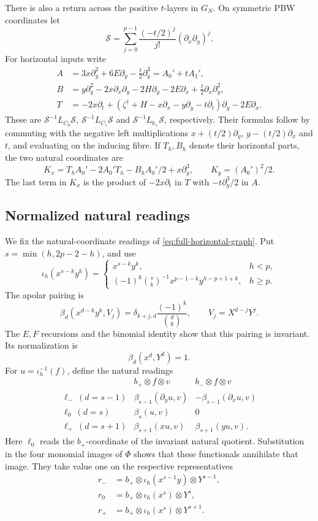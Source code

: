 \documentclass[11pt]{article}
\theoremstyle{plain}
\theoremstyle{definition}
\theoremstyle{remark}
\numberwithin{equation}{section}
\begin{document}
There is also a return across the positive $t$-layers in $G_N$.
On symmetric PBW coordinates let
\[
 \mathscr S=\sum_{j=0}^{p-1}\frac{(-t/2)^j}{j!}
                       (\partial_x\partial_y)^j.
\]
For horizontal inputs write
\begin{align*}
 A&=3x\partial_y^2+6E\partial_y-\tfrac t2\partial_y^3=A_0'+tA_1',\\
 B&=y\partial_y^2-2x\partial_x\partial_y-2H\partial_y-2E\partial_x
                       +\tfrac t2\partial_x\partial_y^2,\\
 T&=-2x\partial_t+
 (\zeta^\dagger+H-x\partial_x-y\partial_y-t\partial_t)\partial_y-2E\partial_x.
\end{align*}
These are $\mathscr S^{-1}L_{C_0}\mathscr S$,
$\mathscr S^{-1}L_{C_1}\mathscr S$ and
$\mathscr S^{-1}L_{b_+}\mathscr S$, respectively.
Their formulas follow by commuting with the negative left multiplications
$x+(t/2)\partial_y$, $y-(t/2)\partial_x$ and $t$, and evaluating on the inducing fibre.
If $T_h,B_h$ denote their horizontal parts, the two natural coordinates are
\[
 K_x=T_hA_0'-2A_0'T_h-B_hA_0'/2+x\partial_y^3,
 \qquad K_y=(A_0')^2/2.
\]
The last term in $K_x$ is the product of $-2x\partial_t$ in $T$
with $-t\partial_y^3/2$ in $A$.

\subsection{Normalized natural readings}\label{sec:normalized-natural}

We fix the natural-coordinate readings of
\eqref{eq:full-horizontal-graph}.
Put \(s=\min(h,2p-2-h)\), and use
\[
 \iota_h(x^{s-k}y^k)=
 \begin{cases}
 x^{s-k}y^k,&h<p,\\
 (-1)^k\binom sk^{-1}x^{p-1-k}y^{h-p+1+k},&h\ge p .
 \end{cases}
\]
The apolar pairing is
\[
 \beta_d(x^{d-k}y^k,V_j)
   =\delta_{k+j,d}\frac{(-1)^k}{\binom dk},
 \qquad V_j=X^{d-j}Y^j .
\]
The \(E,F\) recursions and the binomial identity show that this
pairing is invariant. Its normalization is
\[\beta_d(x^d,Y^d)=1 .\]
For \(u=\iota_h^{-1}(f)\), define the natural readings
\[
\begin{array}{c|cc}
 &b_+\otimes f\otimes v&b_-\otimes f\otimes v\\ \hline
\ell_-\ (d=s-1)&\beta_{s-1}(\partial_yu,v)&-\beta_{s-1}(\partial_xu,v)\\
\ell_0\ (d=s)&\beta_s(u,v)&0\\
\ell_+\ (d=s+1)&\beta_{s+1}(xu,v)&\beta_{s+1}(yu,v).
\end{array}
\]
Here \(\ell_0\) reads the \(b_+\)-coordinate of the invariant
natural quotient. Substitution in the four monomial images of
\(\Phi\) shows that these functionals annihilate that image.
They take value one on the respective representatives
\[
\begin{aligned}
 r_-&=b_+\otimes\iota_h(x^{s-1}y)\otimes Y^{s-1},\\
 r_0&=b_+\otimes\iota_h(x^s)\otimes Y^s,\\
 r_+&=b_+\otimes\iota_h(x^s)\otimes Y^{s+1}.
\end{aligned}
\]
\end{document}
